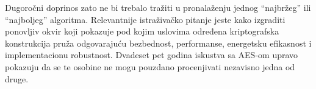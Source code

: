 Dugoročni doprinos zato ne bi trebalo tražiti u pronalaženju jednog
``najbržeg'' ili ``najboljeg'' algoritma. Relevantnije istraživačko
pitanje jeste kako izgraditi ponovljiv okvir koji pokazuje pod kojim
uslovima određena kriptografska konstrukcija pruža odgovarajuću
bezbednost, performanse, energetsku efikasnost i implementacionu
robustnost. Dvadeset pet godina iskustva sa AES-om upravo pokazuju da se
te osobine ne mogu pouzdano procenjivati nezavisno jedna od druge.
